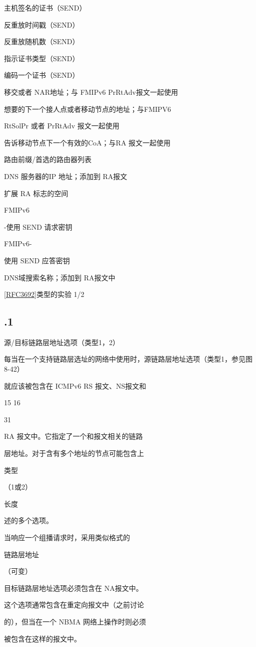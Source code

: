 主机签名的证书（SEND）

反重放时间戳（SEND）

反重放随机数（SEND）

指示证书类型（SEND）

编码一个证书（SEND）

移交或者 NAR地址；与 FMIPv6 PrRtAdv报文一起使用

想要的下一个接人点或者移动节点的地址；与FMIPV6

RtSolPr 或者 PrRtAdv 报文一起使用

告诉移动节点下一个有效的CoA；与RA 报文一起使用

路由前缀/首选的路由器列表

DNS 服务器的IP 地址；添加到 RA报文

扩展 RA 标志的空间

FMIPv6

-使用 SEND 请求密钥

FMIPv6-

使用 SEND 应答密钥

DNS域搜索名称；添加到 RA报文中

\href{https://www.rfc-editor.org/rfc/rfc3692}{[RFC3692]}类型的实验 1/2

\subsection{.1}
源/目标链路层地址选项（类型1，2）

每当在一个支持链路层选址的网络中使用时，源链路层地址选项（类型1，参见图8-42）

就应该被包含在 ICMPv6 RS 报文、NS报文和

15 16

31

RA 报文中。它指定了一个和报文相关的链路

层地址。对于含有多个地址的节点可能包含上

类型

（1或2）

长度

述的多个选项。

当响应一个组播请求时，采用类似格式的

链路层地址

（可变）

目标链路层地址选项必须包含在 NA报文中。

这个选项通常包含在重定向报文中（之前讨论

的），但当在一个 NBMA 网络上操作时则必须

被包含在这样的报文中。


